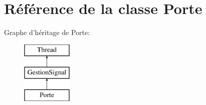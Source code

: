 \hypertarget{classPorte}{
\section{Référence de la classe Porte}
\label{classPorte}
}
Graphe d'héritage de Porte:\begin{figure}[H]
\begin{center}
\leavevmode
\includegraphics[height=3cm]{classPorte}
\end{center}
\end{figure}
